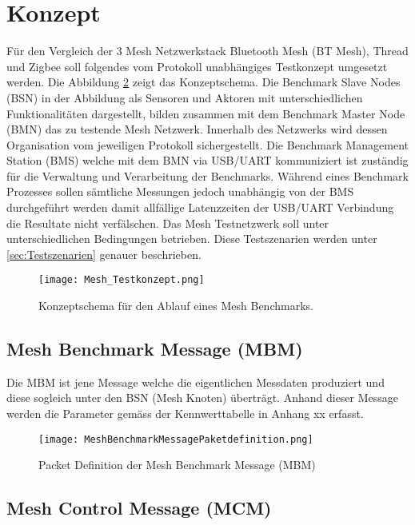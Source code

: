 	\clearpage
\section{Konzept}\label{sec:Konzept}

Für den Vergleich der 3 Mesh Netzwerkstack Bluetooth Mesh (BT Mesh), Thread und Zigbee soll folgendes vom Protokoll unabhängiges Testkonzept umgesetzt werden. 
Die Abbildung \ref{fig:MeshTestKonzept} zeigt das Konzeptschema. Die Benchmark Slave Nodes (BSN) in der Abbildung als Sensoren und Aktoren mit unterschiedlichen Funktionalitäten dargestellt, bilden zusammen mit dem Benchmark Master Node (BMN) das zu testende Mesh Netzwerk. Innerhalb des Netzwerks wird dessen Organisation vom jeweiligen Protokoll sichergestellt. 
Die Benchmark Management Station (BMS) welche mit dem BMN via USB/UART kommuniziert ist zuständig für die Verwaltung und Verarbeitung der Benchmarks. Während eines Benchmark Prozesses sollen sämtliche Messungen jedoch unabhängig von der BMS durchgeführt werden damit allfällige Latenzzeiten der USB/UART Verbindung die Resultate nicht verfälschen.
Das Mesh Testnetzwerk soll unter unterschiedlichen Bedingungen betrieben. Diese Testszenarien werden unter \ref{sec:Testszenarien} genauer beschrieben.


\begin{figure}[H]
	\centering
	\texttt{[image: Mesh\_Testkonzept.png]}
	\caption{Konzeptschema für den Ablauf eines Mesh Benchmarks.}\label{fig:MeshTestKonzept}
\end{figure}


\subsection{Mesh Benchmark Message (MBM)}\label{subsec:MeshBenchmarkMessage}
Die MBM ist jene Message welche die eigentlichen Messdaten produziert und diese sogleich unter den BSN (Mesh Knoten) überträgt. Anhand dieser Message werden die Parameter gemäss der Kennwerttabelle in Anhang xx erfasst.


\begin{figure}[H]
	\centering
	\texttt{[image: MeshBenchmarkMessagePaketdefinition.png]}
	\caption{Packet Definition der Mesh Benchmark Message (MBM)}\label{fig:MeshTestKonzept}
\end{figure}


\subsection{Mesh Control Message (MCM)}\label{subsec:MeshControlMessage}


